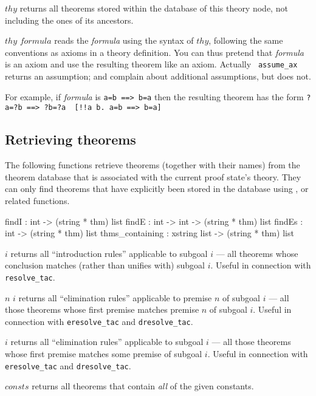 \begin{ttdescription}
\item[\ttindexbold{thms_of} $thy$] returns all theorems stored within
  the database of this theory node, not including the ones of its
  ancestors.
  
\item[\ttindexbold{assume_ax} $thy$ $formula$] reads the {\it formula}
  using the syntax of $thy$, following the same conventions as axioms
  in a theory definition.  You can thus pretend that {\it formula} is
  an axiom and use the resulting theorem like an axiom.  Actually {\tt
    assume_ax} returns an assumption;  and
   complain about additional assumptions, but
   does not.

For example, if {\it formula} is
\hbox{\tt a=b ==> b=a} then the resulting theorem has the form
\hbox{\verb'?a=?b ==> ?b=?a  [!!a b. a=b ==> b=a]'}
\end{ttdescription}


\subsection{Retrieving theorems}

The following functions retrieve theorems (together with their names)
from the theorem database that is associated with the current proof
state's theory.  They can only find theorems that have explicitly been
stored in the database using ,  or
related functions.
\begin{ttbox} 
findI           :          int -> (string * thm) list
findE           :   int -> int -> (string * thm) list
findEs          :          int -> (string * thm) list
thms_containing : xstring list -> (string * thm) list
\end{ttbox}
\begin{ttdescription}
\item[\ttindexbold{findI} $i$]
  returns all ``introduction rules'' applicable to subgoal $i$ --- all
  theorems whose conclusion matches (rather than unifies with) subgoal
  $i$.  Useful in connection with \texttt{resolve_tac}.

\item[\ttindexbold{findE} $n$ $i$] returns all ``elimination rules''
  applicable to premise $n$ of subgoal $i$ --- all those theorems whose
  first premise matches premise $n$ of subgoal $i$.  Useful in connection with
  \texttt{eresolve_tac} and \texttt{dresolve_tac}.

\item[\ttindexbold{findEs} $i$] returns all ``elimination rules'' applicable
  to subgoal $i$ --- all those theorems whose first premise matches some
  premise of subgoal $i$.  Useful in connection with \texttt{eresolve_tac} and
  \texttt{dresolve_tac}.
  
\item[\ttindexbold{thms_containing} $consts$] returns all theorems that
  contain \emph{all} of the given constants.
\end{ttdescription}


